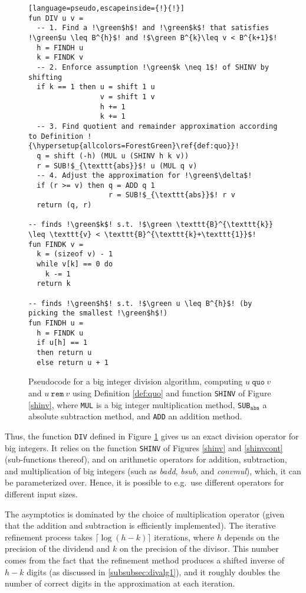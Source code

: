 \begin{figure}
\begin{lstlisting}[language=pseudo,escapeinside={!}{!}]
fun DIV u v =
  -- 1. Find a !\green$h$! and !\green$k$! that satisfies !\green$u \leq B^{h}$! and !$\green B^{k}\leq v < B^{k+1}$!
  h = FINDH u
  k = FINDK v
  -- 2. Enforce assumption !\green$k \neq 1$! of SHINV by shifting
  if k == 1 then u = shift 1 u
                 v = shift 1 v
                 h += 1
                 k += 1
  -- 3. Find quotient and remainder approximation according to Definition !{\hypersetup{allcolors=ForestGreen}\ref{def:quo}}!
  q = shift (-h) (MUL u (SHINV h k v))
  r = SUB!$_{\texttt{abs}}$! u (MUL q v)
  -- 4. Adjust the approximation for !\green$\delta$!
  if (r >= v) then q = ADD q 1
                   r = SUB!$_{\texttt{abs}}$! r v
  return (q, r)

-- finds !\green$k$! s.t. !$\green \texttt{B}^{\texttt{k}} \leq \texttt{v} < \texttt{B}^{\texttt{k}+\texttt{1}}$!
fun FINDK v =
  k = (sizeof v) - 1
  while v[k] == 0 do
    k -= 1
  return k

-- finds !\green$h$! s.t. !$\green u \leq B^{h}$! (by picking the smallest !\green$h$!)
fun FINDH u =
  h = FINDK u
  if u[h] == 1
  then return u
  else return u + 1
\end{lstlisting}
  \caption{\footnotesize Pseudocode for a big integer division algorithm, computing $u~\mathtt{quo}~v$ and $u~ \mathtt{rem}~ v$ using Definition \ref{def:quo} and function \texttt{SHINV} of Figure \ref{shinv}, where \texttt{MUL} is a big integer multiplication method, \texttt{SUB}$_{\mathtt{abs}}$ a absolute subtraction method, and \texttt{ADD} an addition method.}
  \label{div}
\end{figure}

\bigskip

Thus, the function \texttt{DIV} defined in Figure \ref{div} gives us an exact
division operator for big integers. It relies on the function \texttt{SHINV} of
Figures \ref{shinv} and \ref{shinvcont} (sub-functions thereof), and on
arithmetic operators for addition, subtraction, and multiplication of big
integers (such as \textit{badd}, \textit{bsub}, and \textit{convmul}), which, it
can be parameterized over. Hence, it is possible to e.g.\ use different
operators for different input sizes.

The asymptotics is dominated by the choice of multiplication operator (given
that the addition and subtraction is efficiently implemented). The iterative
refinement process takes $\lceil \log (h-k) \rceil$ iterations, where $h$ depends on the
precision of the dividend and $k$ on the precision of the divisor. This number
comes from the fact that the refinement method produces a shifted inverse of
$h-k$ digits (as discussed in \ref{subsubsec:divalg1}), and it roughly doubles
the number of correct digits in the approximation at each iteration.

